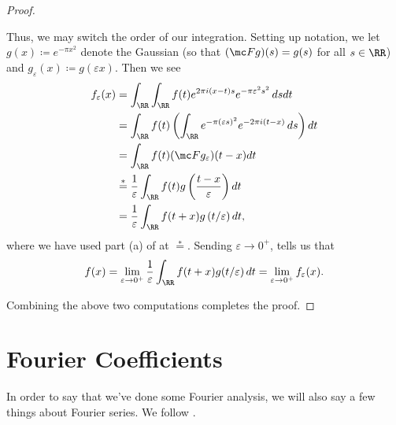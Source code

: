 \documentclass[notes.tex]{subfiles}
\begin{document}
\begin{proof}
\begin{itemize}
		Thus, we may switch the order of our integration. Setting up notation, we let $g(x)\coloneqq e^{-\pi x^2}$ denote the Gaussian (so that $(\mc Fg)(s)=g(s)$ for all $s\in\RR$) and $g_\varepsilon(x)\coloneqq g(\varepsilon x)$. Then we see
		\begin{align*}
			f_\varepsilon(x) &= \int_\RR\int_\RR f(t)e^{2\pi i(x-t)s}e^{-\pi\varepsilon^2s^2}\,dsdt \\
			&= \int_\RR f(t)\left(\int_\RR e^{-\pi(\varepsilon s)^2}e^{-2\pi i(t-x)}\,ds\right)dt \\
			&= \int_\RR f(t)(\mc Fg_\varepsilon)(t-x)dt \\
			&\stackrel*= \frac1\varepsilon\int_\RR f(t)g\left(\frac{t-x}\varepsilon\right)dt \\
			&= \frac1\varepsilon\int_\RR f(t+x)g\left(t/\varepsilon\right)dt,
		\end{align*}
		where we have used part (a) of  at $\stackrel*=$. Sending $\varepsilon\to0^+$,  tells us that
		\[f(x)=\lim_{\varepsilon\to0^+}\frac1\varepsilon\int_\RR f(t+x)g(t/\varepsilon)\,dt=\lim_{\varepsilon\to0^+}f_\varepsilon(x).\]
	\end{itemize}
	Combining the above two computations completes the proof.
\end{proof}

\section{Fourier Coefficients}
In order to say that we've done some Fourier analysis, we will also say a few things about Fourier series. We follow \cite[Chapter~2]{stein-fourier-analysis}.
\end{document}
